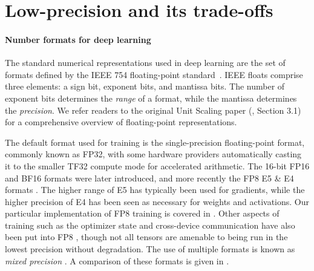 \section{Low-precision and its trade-offs} \label{app:low_precision_and_its_trade_offs}

\paragraph{Number formats for deep learning}

The standard numerical representations used in deep learning are the set of formats defined by the IEEE 754 floating-point standard~\citep{IEEE_754}. IEEE floats comprise three elements: a sign bit, exponent bits, and mantissa bits. The number of exponent bits determines the \textit{range} of a format, while the mantissa determines the \textit{precision}\footnotemark.
We refer readers to the original Unit Scaling paper (\citep{Unit_Scaling}, Section 3.1) for a comprehensive overview of floating-point representations.


The default format used for training is the single-precision floating-point format, commonly known as FP32, with some hardware providers automatically casting it to the smaller TF32 compute mode for accelerated arithmetic. The 16-bit FP16 and BF16 formats were later introduced, and more recently the FP8 E5 \& E4 formats \citep{HFP8, 8_Bit_Numerical_Formats, FP8_Formats}. The higher range of E5 has typically been used for gradients, while the higher precision of E4 has been seen as necessary for weights and activations. Our particular implementation of FP8 training is covered in . Other aspects of training such as the optimizer state and cross-device communication have also been put into FP8 \citep{FP8-LM}, though not all tensors are amenable to being run in the lowest precision \citep{LLM_INT8} without degradation. The use of multiple formats is known as \textit{mixed precision} \citep{Mixed_Precision}. A comparison of these formats is given in .

